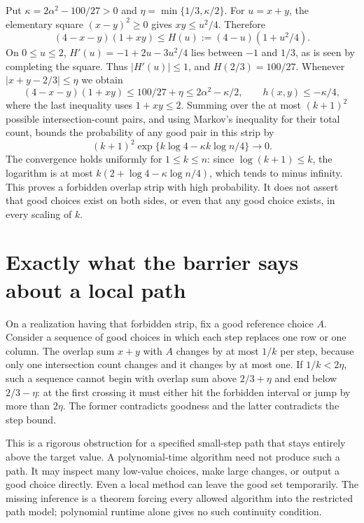 \documentclass[11pt]{article}
\begin{document}
Put $\kappa=2\alpha^2-100/27>0$ and
$\eta=\min\{1/3,\kappa/2\}$. For $u=x+y$, the elementary square
$(x-y)^2\ge0$ gives $xy\le u^2/4$. Therefore
\[
(4-x-y)(1+xy)\le H(u):=(4-u)(1+u^2/4).
\]
On $0\le u\le2$, $H'(u)=-1+2u-3u^2/4$
lies between $-1$ and $1/3$, as is seen by completing the square.
Thus $|H'(u)|\le1$, and $H(2/3)=100/27$. Whenever
$|x+y-2/3|\le\eta$ we obtain
\[
(4-x-y)(1+xy)\le100/27+\eta
\le2\alpha^2-\kappa/2,
\qquad h(x,y)\le-\kappa/4,
\]
where the last inequality uses $1+xy\le2$.
Summing over the at most $(k+1)^2$ possible intersection-count pairs,
and using Markov's inequality for their total count, bounds the
probability of any good pair in this strip by
\[
(k+1)^2\exp\{k\log4-\kappa k\log n/4\}\longrightarrow0.
\]
The convergence holds uniformly for $1\le k\le n$: since
$\log(k+1)\le k$, the logarithm is at most
$k(2+\log4-\kappa\log n/4)$, which tends to minus infinity.
This proves a forbidden overlap strip with high probability. It does
not assert that good choices exist on both sides, or even that any
good choice exists, in every scaling of $k$.

\section{Exactly what the barrier says about a local path}
On a realization having that forbidden strip, fix a good reference
choice $A$. Consider a sequence of good choices in which each step
replaces one row or one column. The overlap sum $x+y$ with $A$ changes
by at most $1/k$ per step, because only one intersection count changes
and it changes by at most one. If $1/k<2\eta$, such a sequence cannot
begin with overlap sum above $2/3+\eta$ and end below $2/3-\eta$:
at the first crossing it must either hit the forbidden interval or
jump by more than $2\eta$. The former contradicts goodness and the
latter contradicts the step bound.

This is a rigorous obstruction for a specified small-step path that
stays entirely above the target value. A polynomial-time algorithm
need not produce such a path. It may inspect many low-value choices,
make large changes, or output a good choice directly. Even a local
method can leave the good set temporarily. The missing inference is
a theorem forcing every allowed algorithm into the restricted path
model; polynomial runtime alone gives no such continuity condition.
\end{document}

